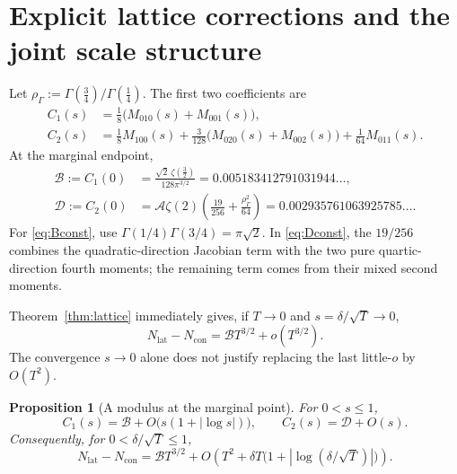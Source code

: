 \documentclass[11pt,a4paper]{article}
\numberwithin{equation}{section}
\newtheorem{proposition}[theorem]{Proposition}
\theoremstyle{definition}
\newcommand{\con}{\mathrm{con}}
\newcommand{\latt}{\mathrm{lat}}
\newcommand{\Aconst}{\mathcal A}
\newcommand{\Bconst}{\mathcal B}
\newcommand{\Dconst}{\mathcal D}
\newcommand{\gfour}{\Gamma(\tfrac14)}
\newcommand{\gthree}{\Gamma(\tfrac34)}
\begin{document}
\section{Explicit lattice corrections and the joint scale structure}
\label{sec:latticecoeffs}

Let $\rho_\Gamma:=\gthree/\gfour$. The first two coefficients are
\begin{align}
 C_1(s)&=\frac18\bigl(M_{010}(s)+M_{001}(s)\bigr),
 \label{eq:C1}\\
 C_2(s)&=\frac18M_{100}(s)+\frac3{128}
       \bigl(M_{020}(s)+M_{002}(s)\bigr)+\frac1{64}M_{011}(s).
 \label{eq:C2}
\end{align}
At the marginal endpoint,
\begin{align}
 \Bconst:=C_1(0)
 &=\frac{\sqrt2\,\zeta(\frac32)}{128\pi^{3/2}}
 =0.005183412791031944\ldots,
 \label{eq:Bconst}\\
 \Dconst:=C_2(0)
 &=\Aconst\zeta(2)\left(\frac{19}{256}
                          +\frac{\rho_\Gamma^2}{64}\right)
 =0.002935761063925785\ldots.
 \label{eq:Dconst}
\end{align}
For \eqref{eq:Bconst}, use $\Gamma(1/4)\Gamma(3/4)=\pi\sqrt2$.
In \eqref{eq:Dconst}, the $19/256$ combines the quadratic-direction
Jacobian term with the two pure quartic-direction fourth moments;
the remaining term comes from their mixed second moments.

Theorem~\ref{thm:lattice} immediately gives, if $T\to0$ and
$s=\delta/\sqrt T\to0$,
\begin{equation}
 N_{\latt}-N_{\con}=\Bconst T^{3/2}+o(T^{3/2}).
 \label{eq:latticeleading}
\end{equation}
The convergence $s\to0$ alone does not justify replacing the last
little-$o$ by $O(T^2)$.

\begin{proposition}[A modulus at the marginal point]
\label{prop:modulus}
For $0<s\le1$,
\begin{equation}
 C_1(s)=\Bconst+O\bigl(s(1+|\log s|)\bigr),\qquad
 C_2(s)=\Dconst+O(s).
 \label{eq:Cmodulus}
\end{equation}
Consequently, for $0<\delta/\sqrt T\le1$,
\begin{equation}
 N_{\latt}-N_{\con}
 =\Bconst T^{3/2}
  +O\left(T^2+\delta T\bigl(1+|\log(\delta/\sqrt T)|\bigr)\right).
 \label{eq:jointleading}
\end{equation}
\end{proposition}
\end{document}
